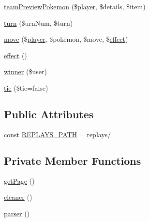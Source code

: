 \begin{DoxyCompactItemize}
\hyperlink{class_replay_parser_ae5cd9d5fab44c3ee94f637b2e96ea8ca}{team\+Preview\+Pokemon} (\$\hyperlink{class_replay_parser_a42c1054e4e59fa30a1582c8a9f625a54}{player}, \$details, \$item)
\item 
\hyperlink{class_replay_parser_a9202833957b689cf20c4a6c166df959e}{turn} (\$urn\+Num, \$turn)
\item 
\hyperlink{class_replay_parser_af8789f1b8220b77c6054efba8fa84c7a}{move} (\$\hyperlink{class_replay_parser_a42c1054e4e59fa30a1582c8a9f625a54}{player}, \$pokemon, \$move, \$\hyperlink{class_replay_parser_a928bb19cb57383719013f8ba5319173c}{effect})
\item 
\hyperlink{class_replay_parser_a928bb19cb57383719013f8ba5319173c}{effect} ()
\item 
\hyperlink{class_replay_parser_a68b9a6f8d99c70c8e6cef889ebe50e3c}{winner} (\$user)
\item 
\hyperlink{class_replay_parser_a5556e8ef7ac8a632e073fc71efb6cbf4}{tie} (\$tie=false)
\end{DoxyCompactItemize}
\subsection*{Public Attributes}
\begin{DoxyCompactItemize}
\item 
const \hyperlink{class_replay_parser_af691df705c38123044bc81f5bd837e95}{R\+E\+P\+L\+A\+Y\+S\+\_\+\+P\+A\+TH} = \textquotesingle{}replays/\textquotesingle{}
\end{DoxyCompactItemize}
\subsection*{Private Member Functions}
\begin{DoxyCompactItemize}
\item 
\hyperlink{class_replay_parser_aba95b604703c0aae7956c51d11f3078b}{get\+Page} ()
\item 
\hyperlink{class_replay_parser_a0007ba7d09041393a501216af378fe87}{cleaner} ()
\item 
\hyperlink{class_replay_parser_a06e573b897046a2755693c8fd923c70b}{parser} ()
\end{DoxyCompactItemize}

